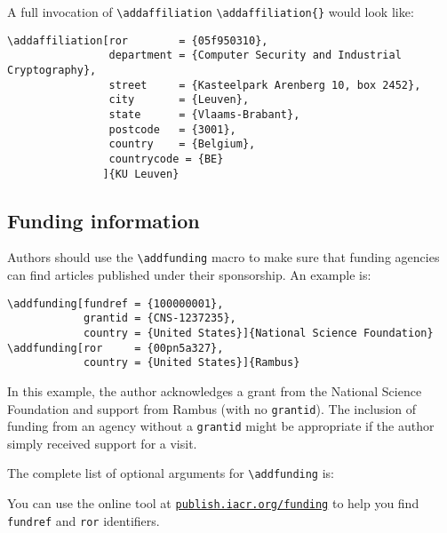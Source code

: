 \documentclass{article}
\newcommand{\cmd}[2][]{%
  \def\FirstArg{#1}%
  \ifx\FirstArg\empty%
    \texttt{\textbackslash{}#2}%
  \else%
    \texttt{\textbackslash{}#2\{#1\}}%
  \fi
}
\begin{document}
A full invocation of \cmd{addaffiliation} would look like:
\begin{Verbatim}[samepage=true]
\addaffiliation[ror        = {05f950310},
                department = {Computer Security and Industrial Cryptography},
                street     = {Kasteelpark Arenberg 10, box 2452},
                city       = {Leuven},
                state      = {Vlaams-Brabant},
                postcode   = {3001},
                country    = {Belgium},
                countrycode = {BE}
               ]{KU Leuven}
\end{Verbatim}
\subsection{Funding information}
Authors should use the \texttt{\textbackslash addfunding} macro to
make sure that funding agencies can find articles published under their
sponsorship. An example is:
\begin{verbatim}
\addfunding[fundref = {100000001},
            grantid = {CNS-1237235},
            country = {United States}]{National Science Foundation}
\addfunding[ror     = {00pn5a327},
            country = {United States}]{Rambus}
\end{verbatim}

\noindent In this example, the author acknowledges a grant from the
National Science Foundation and support from Rambus (with no
\texttt{grantid}). The inclusion of funding from an agency without a
\texttt{grantid} might be appropriate if the author simply received
support for a visit.

The complete list of optional arguments for \texttt{\textbackslash addfunding} is:
\begin{arglist}
\end{arglist}

\noindent You can use the online tool at 
\href{https://publish.iacr.org/funding}{\texttt{publish.iacr.org/funding}} to
help you find \texttt{fundref} and \texttt{ror} identifiers.
\end{document}
